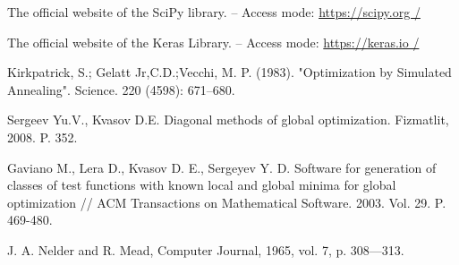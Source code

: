 \documentclass[11pt, oneside, a4paper]{article}
\begin{document}
\begin{biblioen}
The official website of the SciPy library. – Access mode: \url{https://scipy.org /}

The official website of the Keras Library. – Access mode: \url{https://keras.io /}

Kirkpatrick, S.; Gelatt Jr,C.D.;Vecchi, M. P. (1983). "Optimization by Simulated Annealing". Science. 220 (4598): 671–680.

Sergeev Yu.V., Kvasov D.E. Diagonal methods of global optimization. Fizmatlit, 2008. P. 352.

Gaviano M., Lera D., Kvasov D. E., Sergeyev Y. D. Software for generation of classes of test functions with known local and global minima for global optimization // ACM Transactions on Mathematical Software. 2003. Vol. 29. P. 469-480.

J. A. Nelder and R. Mead, Computer Journal, 1965, vol. 7, p. 308—313.



\end{biblioen}
\end{document}
